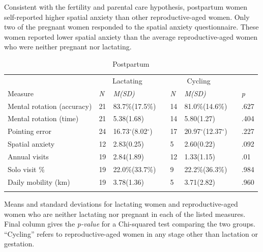 Consistent with the fertility and parental care hypothesis, postpartum women self-reported higher spatial anxiety than other reproductive-aged women.  Only two of the pregnant women responded to the spatial anxiety questionnaire.  These women reported lower spatial anxiety than the average reproductive-aged women who were neither pregnant nor lactating.

\begin{table}[h!]
\caption{Postpartum}
\label{tab:lact}  
\begin{tabular}{llllllll}
\hline\noalign{\smallskip}
& \multicolumn{2}{c}{Lactating} && \multicolumn{2}{c}{Cycling} && \\
Measure & \emph{N} & \emph{M(SD)} && \emph{N} & \emph{M(SD)} && \emph{p} \\
\noalign{\smallskip}\hline\noalign{\smallskip}
Mental rotation (accuracy) & 21 & 83.7\%(17.5\%) && 14 & 81.0\%(14.6\%) && .627 \\
Mental rotation (time) & 21 & 5.38(1.68) && 14 & 5.80(1.27) && .404 \\
Pointing error & 24 & 16.73$^{\circ}$(8.02$^{\circ}$) && 17 & 20.97$^{\circ}$(12.37$^{\circ}$) && .227 \\
Spatial anxiety & 12 & 2.83(0.25) && 5 & 2.60(0.22) && .092 \\
Annual visits & 19 & 2.84(1.89) && 12 & 1.33(1.15) && .01 \\
Solo visit \% & 19 & 22.0\%(33.7\%) && 9 & 22.2\%(36.3\%) && .984 \\
Daily mobility (km) & 19 & 3.78(1.36) && 5 & 3.71(2.82) && .960 \\
\noalign{\smallskip}\hline
\end{tabular}\par
\bigskip
Means and standard deviations for lactating women and reproductive-aged women who are neither lactating nor pregnant in each of the listed measures. Final column gives the \emph{p-value} for a Chi-squared test comparing the two groups.  ``Cycling'' refers to reproductive-aged women in any stage other than lactation or gestation.  
\end{table}	

